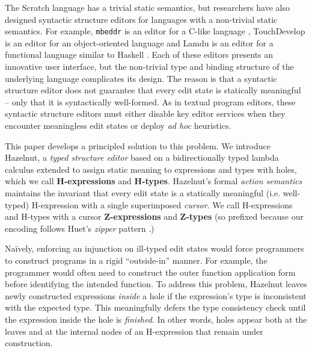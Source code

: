 The Scratch language has a trivial static semantics, but researchers have
also designed syntactic structure editors for languages with a non-trivial
static semantics. For example, \texttt{mbeddr} is an editor for a C-like
language \cite{voelter_mbeddr:_2012}, TouchDevelop is an editor for an
object-oriented language \cite{tillmann_touchdevelop:_2011} and Lamdu is an
editor for a functional language similar to Haskell \cite{lamdu}. Each of
these editors presents an innovative user interface, but the non-trivial
type and binding structure of the underlying language complicates its
design. The reason is that a syntactic structure editor does not guarantee
that every edit state is statically meaningful -- only that it is
syntactically well-formed. As in textual program editors, these syntactic
structure editors must either disable key editor services when they
encounter meaningless edit states or deploy \emph{ad hoc} heuristics.


This paper develops a principled solution to this problem. We introduce
Hazelnut, a \emph{typed structure editor} based on a bidirectionally typed
lambda calculus extended to assign static meaning to expressions and types
with {holes}, which we call \textbf{H-expressions}
and \textbf{H-types}. Hazelnut's formal \emph{action semantics} maintains
the invariant that every edit state is a statically meaningful
(i.e. well-typed) H-expression with a single superimposed \emph{cursor}. We
call H-expressions and H-types with a cursor \textbf{Z-expressions}
and \textbf{Z-types} (so prefixed because our encoding follows
Huet's \emph{zipper} pattern \cite{JFP::Huet1997}.)

Na\"ively, enforcing an injunction on ill-typed edit states would force
programmers to construct programs in a rigid ``outside-in'' manner. For
example, the programmer would often need to construct the outer function
application form before identifying the intended function. To address this
problem, Hazelnut leaves newly constructed expressions \emph{inside} a hole
if the expression's type is inconsistent with the expected type. This
meaningfully defers the type consistency check until the expression inside
the hole is \emph{finished}. In other words, holes appear both at the
leaves and at the internal nodes of an H-expression that remain under
construction.

